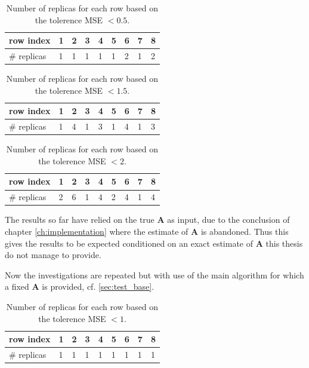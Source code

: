 \begin{table}[h]
\center
\begin{tabular}{|l|l|l|l|l|l|l|l|l|}
\hline
row index   & 1 & 2 & 3 & 4 & 5 & 6 & 7 & 8 \\ \hline
\# replicas & 1 & 1 & 1 & 1 & 1 & 2 & 1 & 2 \\ \hline
\end{tabular}
\caption{Number of replicas for each row based on the tolerence MSE $< 0.5$.}
\label{tab:replica2}
\end{table}

\begin{table}[h]
\center
\begin{tabular}{|l|l|l|l|l|l|l|l|l|}
\hline
row index   & 1 & 2 & 3 & 4 & 5 & 6 & 7 & 8 \\ \hline
\# replicas & 1 & 4 & 1 & 3 & 1 & 4 & 1 & 3 \\ \hline
\end{tabular}
\caption{Number of replicas for each row based on the tolerence MSE $< 1.5$.}
\label{tab:replica3}
\end{table}

\begin{table}[h]
\center
\begin{tabular}{|l|l|l|l|l|l|l|l|l|}
\hline
row index   & 1 & 2 & 3 & 4 & 5 & 6 & 7 & 8 \\ \hline
\# replicas & 2 & 6 & 1 & 4 & 2 & 4 & 1 & 4 \\ \hline
\end{tabular}
\caption{Number of replicas for each row based on the tolerence MSE $< 2$.}
\label{tab:replica4}
\end{table}

The results so far have relied on the true $\textbf{A}$ as input, due to the conclusion of chapter \ref{ch:implementation} where the estimate of $\textbf{A}$ is abandoned. Thus this gives the results to be expected conditioned on an exact estimate of $\textbf{A}$ this thesis do not manage to provide.

Now the investigations are repeated but with use of the main algorithm for which a fixed $\textbf{A}$ is provided, cf. \ref{sec:test_base}. 

\begin{table}[h]
\center
\begin{tabular}{|l|l|l|l|l|l|l|l|l|}
\hline
row index   & 1 & 2 & 3 & 4 & 5 & 6 & 7 & 8 \\ \hline
\# replicas & 1 & 1 & 1 & 1 & 1 & 1 & 1 & 1 \\ \hline
\end{tabular}
\caption{Number of replicas for each row based on the tolerence MSE $< 1$.}
\label{tab:replica5}
\end{table}

